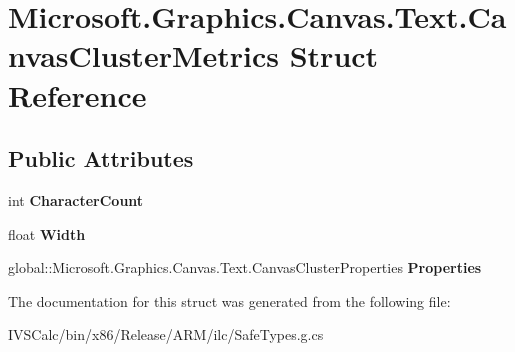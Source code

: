 \hypertarget{struct_microsoft_1_1_graphics_1_1_canvas_1_1_text_1_1_canvas_cluster_metrics}{}\section{Microsoft.\+Graphics.\+Canvas.\+Text.\+Canvas\+Cluster\+Metrics Struct Reference}
\label{struct_microsoft_1_1_graphics_1_1_canvas_1_1_text_1_1_canvas_cluster_metrics}
\subsection*{Public Attributes}
\begin{DoxyCompactItemize}
\item 
\mbox{\label{struct_microsoft_1_1_graphics_1_1_canvas_1_1_text_1_1_canvas_cluster_metrics_a20a3d3a176604c35b28bd588f2404d60}} 
int {\bfseries Character\+Count}
\item 
\mbox{\label{struct_microsoft_1_1_graphics_1_1_canvas_1_1_text_1_1_canvas_cluster_metrics_aaf35263dba362c19c4b9d17cac43f9d3}} 
float {\bfseries Width}
\item 
\mbox{\label{struct_microsoft_1_1_graphics_1_1_canvas_1_1_text_1_1_canvas_cluster_metrics_a95c667963ce043d1f0d2364cc1525192}} 
global\+::\+Microsoft.\+Graphics.\+Canvas.\+Text.\+Canvas\+Cluster\+Properties {\bfseries Properties}
\end{DoxyCompactItemize}


The documentation for this struct was generated from the following file\+:\begin{DoxyCompactItemize}
\item 
I\+V\+S\+Calc/bin/x86/\+Release/\+A\+R\+M/ilc/Safe\+Types.\+g.\+cs\end{DoxyCompactItemize}
